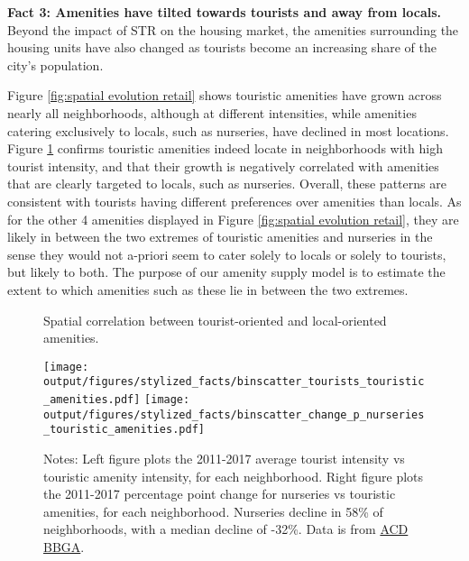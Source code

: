 \documentclass[11pt]{article}
\newcommand{\Paragraph}{\vspace{0.1cm}\noindent\textbf}
\begin{document}
\Paragraph{Fact 3: Amenities have tilted towards tourists and away from locals.} Beyond the impact of STR on the housing market, the amenities surrounding the housing units have also changed as tourists become an increasing share of the city's population. 

Figure \ref{fig:spatial evolution retail} shows touristic amenities have grown across nearly all neighborhoods, although at different intensities, while amenities catering exclusively to locals, such as nurseries, have declined in most locations. Figure \ref{fig:spatial correlation amenities} confirms touristic amenities indeed locate in neighborhoods with high tourist intensity, and that their growth is negatively correlated with amenities that are clearly targeted to locals, such as nurseries. Overall, these patterns are consistent with tourists having different preferences over amenities than locals. As for the other 4 amenities displayed in Figure \ref{fig:spatial evolution retail}, they are likely in between the two extremes of touristic amenities and nurseries in the sense they would not a-priori seem to cater solely to locals or solely to tourists, but likely to both. The purpose of our amenity supply model is to estimate the extent to which amenities such as these lie in between the two extremes.

\begin{figure}[H]
\centering
\caption{Spatial correlation between tourist-oriented and local-oriented amenities.}\label{fig:spatial correlation amenities}
\centering
\texttt{[image: output/figures/stylized\_facts/binscatter\_tourists\_touristic\_amenities.pdf]}%
\texttt{[image: output/figures/stylized\_facts/binscatter\_change\_p\_nurseries\_touristic\_amenities.pdf]}
\caption*{\footnotesize Notes: Left figure plots the 2011-2017 average tourist intensity vs touristic amenity intensity, for each neighborhood. Right figure plots the 2011-2017 percentage point change for nurseries vs touristic amenities, for each neighborhood. Nurseries decline in 58\% of neighborhoods, with a median decline of -32\%. Data is from \href{https://data.amsterdam.nl/datasets/rl6-35tFAw2Ljw/basisbestand-gebieden-amsterdam-bbga/}{ACD BBGA}.}
\end{figure}
\end{document}
